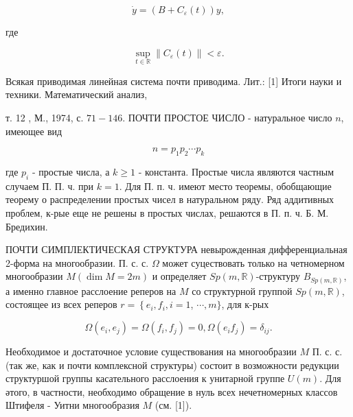 \documentclass[10pt]{article}
\begin{document}
\[

\dot{y}=\left(B+C_{\varepsilon}(t)\right) y,

\]



где



\[

\sup _{t \in \mathbb{R}}\left\|C_{\varepsilon}(t)\right\|<\varepsilon .

\]



Всякая приводимая линейная система почти приводима. Лит.: [1] Итоги науки и техники. Математический анализ,

т. 12 , М., 1974, с. $71-146$. ПОЧТИ ПРОСТОЕ ЧИСЛО - натуральное число $n$, имеющее вид



\[

n=p_{1} p_{2} \cdots p_{k}

\]



где $p_{i}$ - простые числа, а $k \geqslant 1$ - константа. Простые числа являются частным случаем П. П. ч. при $k=1$. Для П. п. ч. имеют место теоремы, обобщающие теорему о распределении простых чисел в натуральном ряду. Ряд аддитивных проблем, к-рые еще не решены в простых числах, решаются в П. п. ч. Б. М. Бредихин.



ПОЧТИ СИМПЛЕКТИЧЕСКАЯ СТРУКТУРА невырожденная дифференциальная 2-форма на многообразии. П. с. с. $\Omega$ может суцествовать только на четномерном многообразии $M(\operatorname{dim} M=2 m)$ и определяет $S p(m, \mathbb{R})$-структуру $B_{S p(m, \mathbb{R})}$, а именно главное расслоение реперов на $M$ со структурной группой $S p(m, \mathbb{R})$, состоящее из всех реперов $r=\left\{e_{i}, f_{i}, i=1\right.$, $\cdots, m\}$, для к-рых



\[

\Omega\left(e_{i}, e_{j}\right)=\Omega\left(f_{i}, f_{j}\right)=0, \Omega\left(e_{i} f_{j}\right)=\delta_{i j} .

\]



Необходимое и достаточное условие существования на многообразии $M$ П. с. с. (так же, как и почти комплексной структуры) состоит в возможности редукции структуршой группы касательного расслоения к унитарной группе $U(m)$. Для әтого, в частности, необходимо обращение в нуль всех нечетномерных классов Штифеля - Уитни многообразия $M$ (см. [1]).
\end{document}
